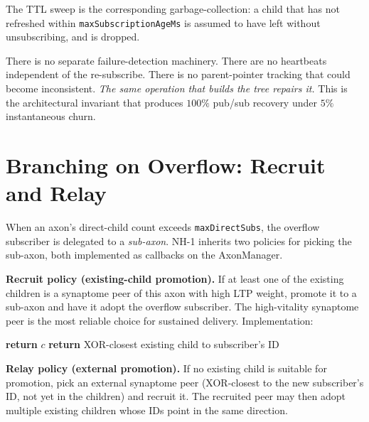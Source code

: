 \documentclass[twoside,nobib]{tufte-book}
\begin{document}
The TTL sweep is the corresponding garbage-collection: a child
that has not refreshed within \texttt{maxSubscriptionAgeMs} is
assumed to have left without unsubscribing, and is dropped.

There is no separate failure-detection machinery. There are no
heartbeats independent of the re-subscribe. There is no parent-pointer
tracking that could become inconsistent. \emph{The same operation
that builds the tree repairs it.} This is the architectural
invariant that produces $100\%$ pub/sub recovery under $5\%$
instantaneous churn.

\section{Branching on Overflow: Recruit and Relay}

When an axon's direct-child count exceeds
\texttt{maxDirectSubs}, the overflow subscriber is delegated to a
\emph{sub-axon}. NH-1 inherits two policies for picking the
sub-axon, both implemented as callbacks on the AxonManager.

\textbf{Recruit policy (existing-child promotion).} If at least
one of the existing children is a synaptome peer of this axon
with high LTP weight, promote it to a sub-axon and have it adopt
the overflow subscriber. The high-vitality synaptome peer is the
most reliable choice for sustained delivery. Implementation:

\begin{algorithm}
\caption{pickRecruitPeer(role, meta, subscriberId)}
\begin{algorithmic}[1]
    \State \textbf{return} $c$
  \EndIf
\EndFor
\State \textbf{return} XOR-closest existing child to subscriber's ID
\end{algorithmic}
\end{algorithm}

\textbf{Relay policy (external promotion).} If no existing child
is suitable for promotion, pick an external synaptome peer
(XOR-closest to the new subscriber's ID, not yet in the
children) and recruit it. The recruited peer may then adopt
multiple existing children whose IDs point in the same direction.
\end{document}
